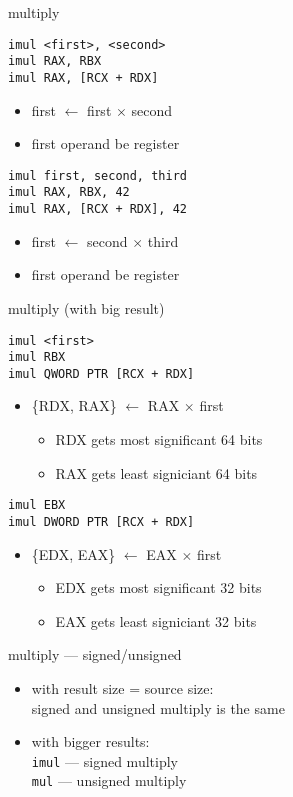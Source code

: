 \begin{frame}[fragile,label=mult]{multiply}
\begin{lstlisting}
imul <first>, <second>
imul RAX, RBX
imul RAX, [RCX + RDX]
\end{lstlisting}
\begin{itemize}
\item first $\leftarrow$ first $\times$ second
\item first operand  be register
\end{itemize}
\begin{lstlisting}
imul first, second, third
imul RAX, RBX, 42
imul RAX, [RCX + RDX], 42
\end{lstlisting}
\begin{itemize}
\item first $\leftarrow$ second $\times$ third
\item first operand  be register
\end{itemize}
\end{frame}

\begin{frame}[fragile,label=bigMult]{multiply (with big result)}
\begin{lstlisting}
imul <first>
imul RBX
imul QWORD PTR [RCX + RDX]
\end{lstlisting}
\begin{itemize}
\item \{RDX, RAX\} $\leftarrow$ RAX $\times$ first
\begin{itemize}
\item RDX gets most significant 64 bits
\item RAX gets least signiciant 64 bits
\end{itemize}
\end{itemize}
\begin{lstlisting}
imul EBX
imul DWORD PTR [RCX + RDX]
\end{lstlisting}
\begin{itemize}
\item \{EDX, EAX\} $\leftarrow$ EAX $\times$ first
\begin{itemize}
\item EDX gets most significant 32 bits
\item EAX gets least signiciant 32 bits
\end{itemize}
\end{itemize}
\end{frame}

\begin{frame}{multiply --- signed/unsigned}
\begin{itemize}
\item with result size = source size: \\
signed and unsigned multiply is the same
\item with bigger results: \\
\texttt{imul} --- signed multiply \\
\texttt{mul} --- unsigned multiply
\end{itemize}
\end{frame}

